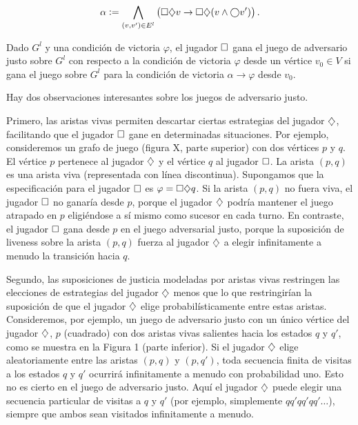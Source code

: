 \[
	\alpha := \bigwedge_{(v, v') \in E^{l}} \left( \square \diamondsuit v \rightarrow \square \diamondsuit (v \wedge \bigcirc v') \right).
\]

Dado $G^{l}$ y una condición de victoria $\varphi$, el jugador $\square$ gana el
juego de adversario justo sobre $G^{l}$ con respecto a la condición de victoria
$\varphi$ desde un vértice $v_0 \in V$ si gana el juego sobre $G^{l}$ para la
condición de victoria $\alpha \rightarrow \varphi$ desde $v_0$.

Hay dos observaciones interesantes sobre los juegos de adversario justo.

Primero, las aristas vivas permiten descartar ciertas estrategias del jugador
$\diamondsuit$, facilitando que el jugador $\square$ gane en determinadas situaciones.
Por ejemplo, consideremos un grafo de juego (figura X, parte superior) con dos
vértices $p$ y $q$. El vértice $p$ pertenece al jugador $\diamondsuit$ y el vértice
$q$ al jugador $\square$. La arista $(p, q)$ es una arista viva (representada con
línea discontinua). Supongamos que la especificación para el jugador $\square$ es
$\varphi = \square \diamondsuit q$. Si la arista $(p, q)$ no fuera viva, el jugador
$\square$ no ganaría desde $p$, porque el jugador $\diamondsuit$ podría mantener el
juego atrapado en $p$ eligiéndose a sí mismo como sucesor en cada turno. En
contraste, el jugador $\square$ gana desde $p$ en el juego adversarial justo,
porque la suposición de liveness sobre la arista $(p, q)$ fuerza al jugador
$\diamondsuit$ a elegir infinitamente a menudo la transición hacia $q$.

Segundo, las suposiciones de justicia modeladas por aristas vivas restringen
las elecciones de estrategias del jugador $\diamondsuit$ menos que lo que
restringirían la suposición de que el jugador $\diamondsuit$ elige probabilísticamente
entre estas aristas. Consideremos, por ejemplo, un juego de adversario justo
con un único vértice del jugador $\diamondsuit$, $p$ (cuadrado) con dos aristas vivas
salientes hacia los estados $q$ y $q'$, como se muestra en la Figura 1 (parte
inferior). Si el jugador $\diamondsuit$ elige aleatoriamente entre las aristas $(p,
	q)$ y $(p, q')$, toda secuencia finita de visitas a los estados $q$ y $q'$
ocurrirá infinitamente a menudo con probabilidad uno. Esto no es cierto en el
juego de adversario justo. Aquí el jugador $\diamondsuit$ puede elegir una secuencia
particular de visitas a $q$ y $q'$ (por ejemplo, simplemente $qq'qq'qq'\dots$),
siempre que ambos sean visitados infinitamente a menudo.

